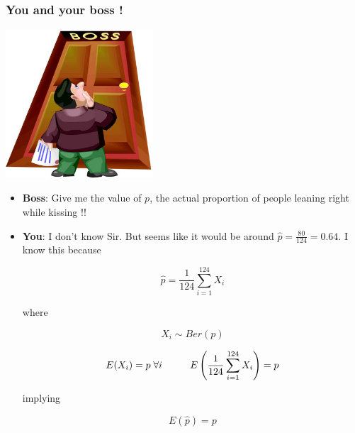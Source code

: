 \documentclass{beamer}\usepackage[]{graphicx}\usepackage[]{color}
\begin{document}
\begin{frame}[fragile]
\frametitle{You and your boss !}


\begin{center}
\includegraphics[width=5.5cm,height=5.3 cm]{boss_cartoon.jpg}
\end{center}

\end{frame}


\begin{frame}[fragile]

\begin{itemize}
\item \textbf{Boss}: Give me the value of $p$, the actual proportion of people leaning right while kissing !! \pause

\item \textbf{You}: I don't know Sir. But seems like it would be around $\hat{p}=\frac{80}{124} = 0.64$. I know this because

$$ \hat{p} = \frac{1}{124} \sum_{i=1}^{124} X_{i}  $$ \pause

where

$$ X_{i} \sim Ber (p)  $$ \pause

$$  E(X_i) = p \; \forall i \hspace{1 cm} E \left (\frac{1}{124} \sum_{i=1}^{124} X_{i} \right ) = p $$ \pause

implying

$$  E(\hat{p}) = p $$ \pause

\end{itemize}

\end{frame}
\end{document}
